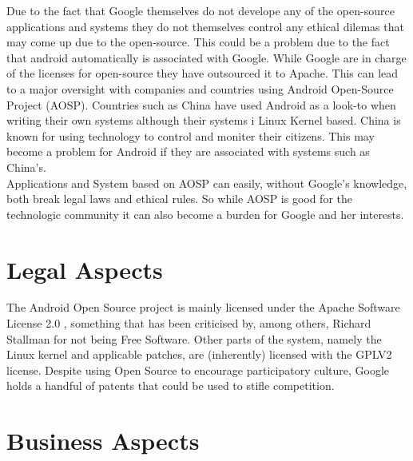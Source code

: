 \documentclass[conference]{IEEEtran}
\begin{document}
Due to the fact that Google themselves do not develope any of the open-source applications and systems they do not themselves control any ethical dilemas that may come up due to the open-source. This could be a problem due to the fact that android automatically is associated with Google. While Google are in charge of the licenses for open-source they have outsourced it to Apache.\cite{android-licenses} This can lead to a major oversight with companies and countries using Android Open-Source Project (AOSP). Countries such as China have used Android as a look-to when writing their own systems \cite{country-license} although their systems i Linux Kernel based. China is known for using technology to control and moniter their citizens. This may become a problem for Android if they are associated with systems such as China's.\\
Applications and System based on AOSP can easily, without Google's knowledge, both break legal laws and ethical rules. So while AOSP is good for the technologic community it can also become a burden for Google and her interests.


\section{Legal Aspects}
\label{legal}

The Android Open Source project is mainly licensed under the Apache Software License 2.0 \cite{apache-license}, something that has been criticised by, among others, Richard Stallman for not being Free Software\cite{rms-android}. Other parts of the system, namely the Linux kernel and applicable patches, are (inherently) licensed with the GPLV2 license\cite{gplv2}\cite{android-licenses}. Despite using Open Source to encourage participatory culture, Google holds a handful of patents that could be used to stifle competition\cite{google-slide-unlock}\cite{google-radial-menu}.


\section{Business Aspects}
\label{financial}
\end{document}
